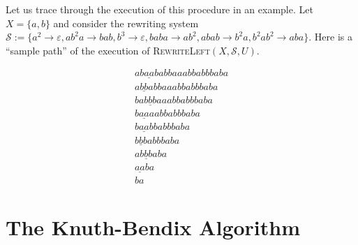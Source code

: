 \begin{eg} Let us trace through the execution of this procedure in an example.
    Let $X = \{a,b\}$ and consider the rewriting system $\mathcal{S} := \{a^2
    \rightarrow \varepsilon, ab^2a \rightarrow bab, b^3 \rightarrow
    \varepsilon, baba \rightarrow ab^2, abab \rightarrow b^2a, b^2ab^2 \rightarrow
    aba\}.$ Here is a ``sample path'' of the execution of \textsc{RewriteLeft}$(X,
    \mathcal{S}, U)$.

    \begin{align*}
        ab\underline{aa}babbaaabbabbbaba \\
        \underline{abba}bbaaabbabbbaba \\
        ba\underline{bbb}aaabbabbbaba \\
        b\underline{aa}aabbabbbaba \\
        b\underline{aa}bbabbbaba \\
        \underline{bbb}abbbaba \\
        a\underline{bbb}aba \\
        \underline{aa}ba \\
        ba
    \end{align*}
\end{eg}

\section{The Knuth-Bendix Algorithm}


